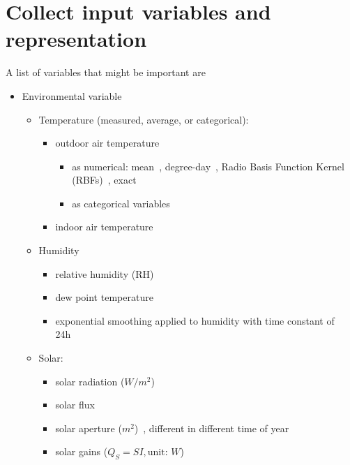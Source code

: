 \documentclass[12pt]{article}
\begin{document}
\section{Collect input variables and representation}
A list of variables that might be important are
\begin{itemize}
\item Environmental variable
  \begin{itemize}
  \item Temperature (measured, average, or categorical): 
    \begin{itemize}
    \item outdoor air temperature
      \begin{itemize}
      \item as numerical: mean~\cite{haberl1994bin,
          hammarsten1987critical, kissock2008methodology,
          dong2005applying}, degree-day~\cite{reddy1997baselining,
          fels1986prism, pmWeather}, Radio Basis Function Kernel
        (RBFs)~\cite{wytock2013contextually},
        exact~\cite{mackay1996bayesian, Zhang2015177, cao2003support}
      \item as categorical variables~\cite{Yu20101637}
      \end{itemize}
    \item indoor air temperature~\cite{hammarsten1987critical}
    \end{itemize}
  \item Humidity
    \begin{itemize}
    \item relative humidity (RH)~\cite{dong2005applying}
    \item dew point temperature~\cite{cao2003support}
    \item exponential smoothing applied to humidity with time constant of 24h~\cite{brown2012kernel}
    \end{itemize}
  \item Solar: 
    \begin{itemize}
    \item solar radiation ($W / m^2$)~\cite{hammarsten1987critical, dong2005applying}
    \item solar flux~\cite{mackay1996bayesian}
    \item solar aperture ($m^2$)~\cite{hammarsten1987critical}, different in different time of year
    \item solar gains ($Q_S = SI, \text{unit: } W$)~\cite{hammarsten1987critical}
    \end{itemize}

\end{itemize}
\end{itemize}
\end{document}
